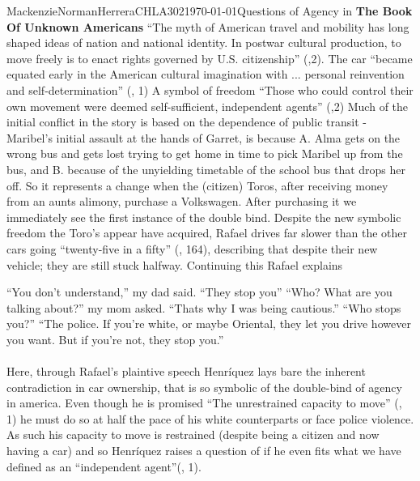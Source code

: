 \documentclass{article}
\begin{document}
\begin{mla}{Mackenzie}{Norman}{Herrera}{CHLA302}{\today}{Questions of Agency in \textbf{The Book Of Unknown Americans}}
``The myth of American travel and mobility has long shaped ideas of nation and national identity. In postwar cultural production, to move freely is to enact rights governed by U.S. citizenship'' (\cite{ruiz2015transit},2). The car ``became equated early in the American cultural imagination with ... personal reinvention and self-determination'' (\cite{Uhlman2015-qx}, 1) A symbol of freedom ``Those who could control their own movement were deemed self-sufficient, independent agents'' (\cite{Uhlman2015-qx},2) Much of the initial conflict in the story is based on the dependence of public transit - Maribel's initial assault at the hands of Garret, is because A. Alma gets on the wrong bus and gets lost trying to get home in time to pick Maribel up from the bus, and B. because of the unyielding timetable of the school bus that drops her off. So it represents a change when the (citizen) Toros, after receiving money from an aunts alimony, purchase a Volkswagen. After purchasing it we immediately see the first instance of the double bind. Despite the new symbolic freedom the Toro's appear have acquired, Rafael drives far slower than the other cars going ``twenty-five in a fifty'' (\cite{Henriquez2014-sh}, 164), describing that despite their new vehicle; they are still stuck halfway. Continuing this Rafael explains


\noindent\linebreak
``You don't understand,'' my dad said. ``They stop you''
\noindent\linebreak
``Who? What are you talking about?'' my mom asked.
\noindent\linebreak
``Thats why I was being cautious.''
\noindent\linebreak
``Who stops you?''
\noindent\linebreak
``The police. If you're white, or maybe Oriental, they let you drive however you want. But if you're not, they stop you.''
\paragraph{}
Here, through Rafael's plaintive speech Henríquez lays bare the inherent contradiction in car ownership, that is so symbolic of the double-bind of agency in america. Even though he is promised ``The unrestrained capacity to move'' (\cite{Uhlman2015-qx}, 1) he must do so at half the pace of his white counterparts or face police violence. As such his capacity to move is restrained (despite being a citizen and now having a car) and so Henríquez raises a question of if he even fits what we have defined as an ``independent agent''(\cite{Uhlman2015-qx}, 1).




\end{mla}
\end{document}
